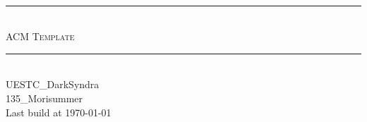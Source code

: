 \begin{titlepage}
	\pagestyle{empty}
	
  \begin{center}
		~\\[80pt]
    \hrule\ \\[8pt]
    \fontsize{48pt}{\baselineskip}\selectfont  \textsc{ACM Template}\\[8pt]
    \hrule\ \\[150pt]
    \selectfont UESTC\_DarkSyndra \\[250pt]
    \huge 135\_Morisummer\\[8pt]
    \Large Last build at \today
  \end{center}
\end{titlepage}
\restoregeometry
